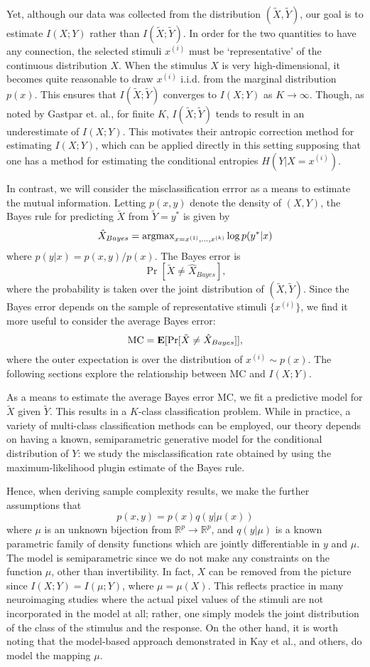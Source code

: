\documentclass[12pt]{article}
\begin{document}
Yet, although our data was collected from the distribution
$(\tilde{X}, \tilde{Y})$, our goal is to estimate $I(X; Y)$ rather
than $I(\tilde{X}; \tilde{Y})$.  In order for the two quantities to
have any connection, the selected stimuli $x^{(i)}$ must be
`representative' of the continuous distribution $X$.  When the
stimulus $X$ is very high-dimensional, it becomes quite reasonable to
draw $x^{(i)}$ i.i.d. from the marginal distribution $p(x).$ This
ensures that $I(\tilde{X}; \tilde{Y})$ converges to $I(X; Y)$ as
$K \to \infty$.  Though, as noted by Gastpar et. al., for finite $K$,
$I(\tilde{X}; \tilde{Y})$ tends to result in an underestimate of $I(X;
Y)$. This motivates their antropic correction method for estimating
$I(X;Y)$, which can be applied directly in this setting supposing that
one has a method for estimating the conditional entropies $H(Y|X =
x^{(i)})$.

In contrast, we will consider the misclassification errror as a means to
estimate the mutual information.  Letting $p(x,y)$ denote the density of $(X,Y)$,
the Bayes rule for predicting $\tilde{X}$ from $\tilde{Y} = y^*$ is given by
\[
\hat{X}_{Bayes} = \text{argmax}_{x = x^{(1)}, \hdots, x^{(k)}} \log p(y^*|x)
\]
where $p(y|x) = p(x,y)/p(x)$.  The Bayes error is
\[
\Pr[\tilde{X} \neq \hat{X}_{Bayes}],
\]
where the probability is taken over the joint distribution of
$(\tilde{X}, \tilde{Y})$.  Since the Bayes error depends on the
sample of representative stimuli $\{x^{(i)}\}$,
we find it more useful to consider the average Bayes error:
\[
\text{MC} = \textbf{E}[\Pr[\tilde{X} \neq \hat{X}_{Bayes}]],
\]
where the outer expectation is over the distribution of $x^{(i)} \sim p(x)$.
The following sections explore the relationship between $\text{MC}$
and $I(X;Y)$.

As a means to estimate the average Bayes error $\text{MC}$, we fit a
predictive model for $\tilde{X}$ given $\tilde{Y}$.  This results in a
$K$-class classification problem.  While in practice, a variety of
multi-class classification methods can be employed, our theory depends
on having a known, semiparametric generative model for the conditional
distribution of $Y$: we study the misclassification rate obtained by
using the maximum-likelihood plugin estimate of the Bayes rule.

Hence, when deriving sample complexity results, we make the further assumptions
that
\[
p(x, y) = p(x) q(y|\mu(x))
\]
where $\mu$ is an unknown bijection from
$\mathbb{R}^p \to \mathbb{R}^p$, and $q(y|\mu)$ is a known parametric family of density
functions which are jointly differentiable in $y$ and $\mu$.  The
model is semiparametric since we do not make any constraints on the
function $\mu$, other than invertibility.  In fact, $X$ can be removed
from the picture since $I(X; Y)= I(\mu; Y)$, where $\mu = \mu(X)$.
This reflects practice in many neuroimaging studies where the actual
pixel values of the stimuli are not incorporated in the model at all;
rather, one simply models the joint distribution of the class of the
stimulus and the response.  On the other hand, it is worth noting
that the model-based approach demonstrated in Kay et al., and others,
do model the mapping $\mu$.
\end{document}
